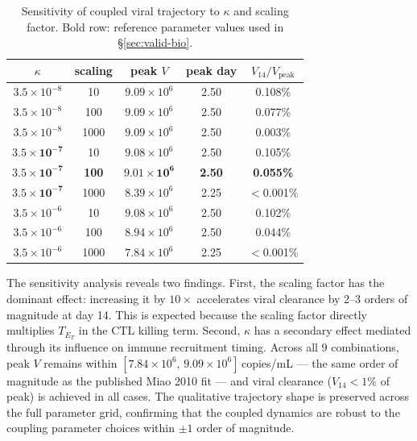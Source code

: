\documentclass[conference,letterpaper,10pt]{IEEEtran}
\begin{document}
\begin{table}[t]
\centering
\caption{Sensitivity of coupled viral trajectory to $\kappa$ and
scaling factor. Bold row: reference parameter values used in
\S\ref{sec:valid-bio}.}
\label{tab:sensitivity}
\renewcommand{\arraystretch}{1.0}
\footnotesize
\begin{tabular}{ccccc}
\toprule
\textbf{$\kappa$} & \textbf{scaling} & \textbf{peak $V$} & \textbf{peak day} & \textbf{$V_{14}/V_{\text{peak}}$}\\
\midrule
$3.5{\times}10^{-8}$ &  10  & $9.09{\times}10^{6}$ & 2.50 & 0.108\%\\
$3.5{\times}10^{-8}$ & 100  & $9.09{\times}10^{6}$ & 2.50 & 0.077\%\\
$3.5{\times}10^{-8}$ & 1000 & $9.09{\times}10^{6}$ & 2.50 & 0.003\%\\
$\mathbf{3.5{\times}10^{-7}}$ &  10  & $9.08{\times}10^{6}$ & 2.50 & 0.105\%\\
$\mathbf{3.5{\times}10^{-7}}$ & \textbf{100}  & $\mathbf{9.01{\times}10^{6}}$ & \textbf{2.50} & \textbf{0.055\%}\\
$\mathbf{3.5{\times}10^{-7}}$ & 1000 & $8.39{\times}10^{6}$ & 2.25 & $<$0.001\%\\
$3.5{\times}10^{-6}$ &  10  & $9.08{\times}10^{6}$ & 2.50 & 0.102\%\\
$3.5{\times}10^{-6}$ & 100  & $8.94{\times}10^{6}$ & 2.50 & 0.044\%\\
$3.5{\times}10^{-6}$ & 1000 & $7.84{\times}10^{6}$ & 2.25 & $<$0.001\%\\
\bottomrule
\end{tabular}
\end{table}

The sensitivity analysis reveals two findings. First, the scaling
factor has the dominant effect: increasing it by $10{\times}$
accelerates viral clearance by 2--3 orders of magnitude at day 14. This
is expected because the scaling factor directly multiplies $T_{E_T}$
in the CTL killing term. Second, $\kappa$ has a secondary effect
mediated through its influence on immune recruitment timing. Across
all 9 combinations, peak $V$ remains within
$[7.84{\times}10^{6},\,9.09{\times}10^{6}]$\,copies/mL --- the same
order of magnitude as the published Miao 2010 fit --- and viral
clearance ($V_{14}\!<\!1\%$ of peak) is achieved in all cases. The
qualitative trajectory shape is preserved across the full parameter
grid, confirming that the coupled dynamics are robust to the coupling
parameter choices within $\pm 1$ order of magnitude.
\end{document}
